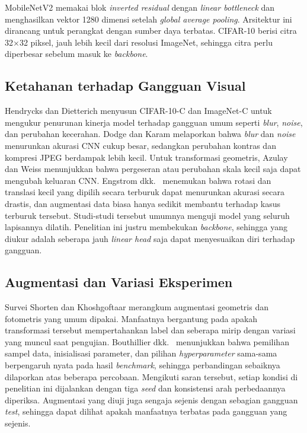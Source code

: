 \documentclass[conference]{IEEEtran}
\begin{document}
MobileNetV2 \cite{sandler2018mobilenetv2} memakai blok \emph{inverted residual} dengan \emph{linear bottleneck} dan menghasilkan vektor 1280 dimensi setelah \emph{global average pooling}. Arsitektur ini dirancang untuk perangkat dengan sumber daya terbatas. CIFAR-10 \cite{krizhevsky2009cifar} berisi citra 32$\times$32 piksel, jauh lebih kecil dari resolusi ImageNet, sehingga citra perlu diperbesar sebelum masuk ke \emph{backbone}.

\subsection{Ketahanan terhadap Gangguan Visual}

Hendrycks dan Dietterich \cite{hendrycks2019benchmarking} menyusun CIFAR-10-C dan ImageNet-C untuk mengukur penurunan kinerja model terhadap gangguan umum seperti \emph{blur}, \emph{noise}, dan perubahan kecerahan. Dodge dan Karam \cite{dodge2016quality} melaporkan bahwa \emph{blur} dan \emph{noise} menurunkan akurasi CNN cukup besar, sedangkan perubahan kontras dan kompresi JPEG berdampak lebih kecil. Untuk transformasi geometris, Azulay dan Weiss \cite{azulay2019small} menunjukkan bahwa pergeseran atau perubahan skala kecil saja dapat mengubah keluaran CNN. Engstrom dkk.\ \cite{engstrom2019spatial} menemukan bahwa rotasi dan translasi kecil yang dipilih secara terburuk dapat menurunkan akurasi secara drastis, dan augmentasi data biasa hanya sedikit membantu terhadap kasus terburuk tersebut. Studi-studi tersebut umumnya menguji model yang seluruh lapisannya dilatih. Penelitian ini justru membekukan \emph{backbone}, sehingga yang diukur adalah seberapa jauh \emph{linear head} saja dapat menyesuaikan diri terhadap gangguan.

\subsection{Augmentasi dan Variasi Eksperimen}

Survei Shorten dan Khoshgoftaar \cite{shorten2019survey} merangkum augmentasi geometris dan fotometris yang umum dipakai. Manfaatnya bergantung pada apakah transformasi tersebut mempertahankan label dan seberapa mirip dengan variasi yang muncul saat pengujian. Bouthillier dkk.\ \cite{bouthillier2021variance} menunjukkan bahwa pemilihan sampel data, inisialisasi parameter, dan pilihan \emph{hyperparameter} sama-sama berpengaruh nyata pada hasil \emph{benchmark}, sehingga perbandingan sebaiknya dilaporkan atas beberapa percobaan. Mengikuti saran tersebut, setiap kondisi di penelitian ini dijalankan dengan tiga \emph{seed} dan konsistensi arah perbedaannya diperiksa. Augmentasi yang diuji juga sengaja sejenis dengan sebagian gangguan \emph{test}, sehingga dapat dilihat apakah manfaatnya terbatas pada gangguan yang sejenis.
\end{document}
